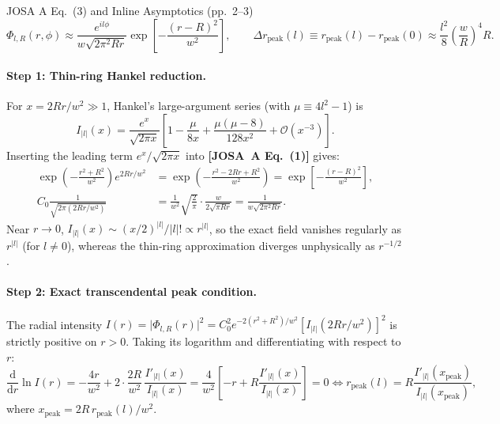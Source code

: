 \documentclass[10pt,letterpaper]{article}
\newcommand{\abs}[1]{\lvert #1 \rvert}
\newcommand{\dd}{\mathrm{d}}
\newcommand{\josa}[1]{\textbf{[JOSA~A Eq.~(#1)]}}
\numberwithin{equation}{section}
\begin{document}
\begin{targeteq}{JOSA A Eq.~(3) and Inline Asymptotics (pp.~2--3)}
\[
  \Phi_{l,R}(r,\phi) \approx \frac{e^{il\phi}}{w\sqrt{2\pi^2 Rr}}\exp\!\left[-\frac{(r-R)^2}{w^2}\right], \qquad
  \Delta r_{\mathrm{peak}}(l) \equiv r_{\mathrm{peak}}(l) - r_{\mathrm{peak}}(0) \approx \frac{l^2}{8}\left(\frac{w}{R}\right)^4 R.
\]
\end{targeteq}

\paragraph*{Step 1: Thin-ring Hankel reduction.}
For $x = 2Rr/w^2 \gg 1$, Hankel's large-argument series (with $\mu \equiv 4l^2 - 1$) is
\begin{equation}
  I_{\abs{l}}(x) = \frac{e^x}{\sqrt{2\pi x}}\left[1 - \frac{\mu}{8x} + \frac{\mu(\mu-8)}{128 x^2} + \mathcal{O}(x^{-3})\right].
  \label{eq:wb_hankel}
\end{equation}
Inserting the leading term $e^x/\sqrt{2\pi x}$ into \josa{1} gives:
\begin{align}
  \exp\!\left(-\frac{r^2+R^2}{w^2}\right) e^{2Rr/w^2} &= \exp\!\left(-\frac{r^2 - 2Rr + R^2}{w^2}\right) = \exp\!\left[-\frac{(r-R)^2}{w^2}\right], \\
  C_0 \frac{1}{\sqrt{2\pi(2Rr/w^2)}} &= \frac{1}{w^2}\sqrt{\frac{2}{\pi}}\cdot\frac{w}{2\sqrt{\pi Rr}} = \frac{1}{w\sqrt{2\pi^2 Rr}}.
\end{align}
Near $r \to 0$, $I_{\abs{l}}(x) \sim (x/2)^{\abs{l}}/\abs{l}! \propto r^{\abs{l}}$, so the exact field vanishes regularly as $r^{\abs{l}}$ (for $l \neq 0$), whereas the thin-ring approximation diverges unphysically as $r^{-1/2}$.

\paragraph*{Step 2: Exact transcendental peak condition.}
The radial intensity $I(r) = \abs{\Phi_{l,R}(r)}^2 = C_0^2 e^{-2(r^2+R^2)/w^2}[I_{\abs{l}}(2Rr/w^2)]^2$ is strictly positive on $r > 0$. Taking its logarithm and differentiating with respect to $r$:
\begin{equation}
  \frac{\dd}{\dd r}\ln I(r) = -\frac{4r}{w^2} + 2\cdot\frac{2R}{w^2}\,\frac{I'_{\abs{l}}(x)}{I_{\abs{l}}(x)} = \frac{4}{w^2}\left[-r + R\frac{I'_{\abs{l}}(x)}{I_{\abs{l}}(x)}\right] = 0 \iff r_{\mathrm{peak}}(l) = R\frac{I'_{\abs{l}}(x_{\mathrm{peak}})}{I_{\abs{l}}(x_{\mathrm{peak}})},
\end{equation}
where $x_{\mathrm{peak}} = 2R\,r_{\mathrm{peak}}(l)/w^2$.
\end{document}
